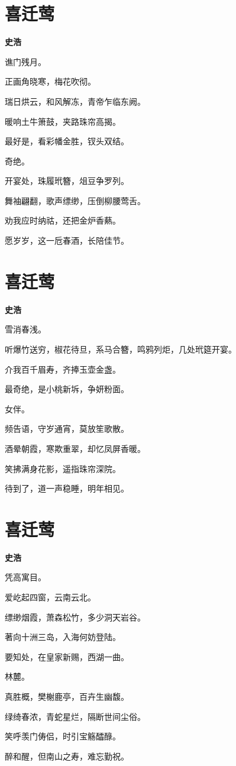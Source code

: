 \documentclass[12pt,a4paper]{ctexbook}
\begin{document}
\section{喜迁莺}
\textbf{史浩}\par\vspace{0.5em}
谯门残月。\par
正画角晓寒，梅花吹彻。\par
瑞日烘云，和风解冻，青帝乍临东阙。\par
暖响土牛箫鼓，夹路珠帘高揭。\par
最好是，看彩幡金胜，钗头双结。\par
奇绝。\par
开宴处，珠履玳簪，俎豆争罗列。\par
舞袖翩翻，歌声缥缈，压倒柳腰莺舌。\par
劝我应时纳祜，还把金炉香爇。\par
愿岁岁，这一卮春酒，长陪佳节。\par

\section{喜迁莺}
\textbf{史浩}\par\vspace{0.5em}
雪消春浅。\par
听爆竹送穷，椒花待旦，系马合簪，鸣鸦列炬，几处玳筵开宴。\par
介我百千眉寿，齐捧玉壶金盏。\par
最奇绝，是小桃新坼，争妍粉面。\par
女伴。\par
频告语，守岁通宵，莫放笙歌散。\par
酒晕朝霞，寒欺重翠，却忆凤屏香暖。\par
笑拂满身花影，遥指珠帘深院。\par
待到了，道一声稳睡，明年相见。\par

\section{喜迁莺}
\textbf{史浩}\par\vspace{0.5em}
凭高寓目。\par
爱屹起四窗，云南云北。\par
缥缈烟霞，萧森松竹，多少洞天岩谷。\par
著向十洲三岛，入海何妨登陆。\par
要知处，在皇家新赐，西湖一曲。\par
林麓。\par
真胜概，樊榭鹿亭，百卉生幽馥。\par
绿绮春浓，青蛇星烂，隔断世间尘俗。\par
笑呼羡门俦侣，时引宝觞醽醁。\par
醉和醒，但南山之寿，难忘勤祝。\par
\end{document}

